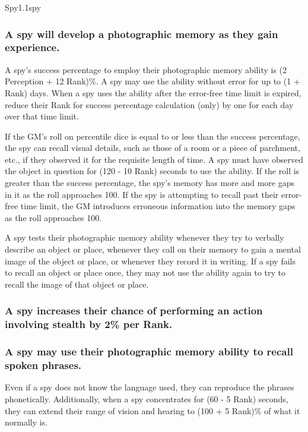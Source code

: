 \begin{skill}{Spy}{1.1}{spy}
\subsubsection{A spy will develop a photographic memory as they gain
experience.}

A spy's success percentage to employ their photographic memory ability
is (2 \x Perception + 12 \x Rank)\%.  A spy may use the ability
without error for up to (1 + Rank) days.  When a spy uses the ability
after the error-free time limit is expired, reduce their Rank for
success percentage calculation (only) by one for each day over that
time limit.

If the GM's roll on percentile dice is equal to or less than the
success percentage, the spy can recall visual details, such as those
of a room or a piece of parchment, etc., if they observed it for the
requisite length of time.  A spy must have observed the object in
question for (120 - 10 \x Rank) seconds to use the ability.  If the
roll is greater than the success percentage, the spy's memory has more
and more gaps in it as the roll approaches 100.  If the spy is
attempting to recall past their error-free time limit, the GM
introduces erroneous information into the memory gaps as the roll
approaches 100.

A spy tests their photographic memory ability whenever they try to
verbally describe an object or place, whenever they call on their
memory to gain a mental image of the object or place, or whenever they
record it in writing. If a spy fails to recall an object or place
once, they may not use the ability again to try to recall the image of
that object or place.

\subsubsection{A spy increases their chance of performing an action
involving stealth by 2\% per Rank.}


\subsubsection{A spy may use their photographic memory ability to recall
spoken phrases.}

Even if a spy does not know the language used, they can reproduce the
phrases phonetically.  Additionally, when a spy concentrates for (60 -
5 \x Rank) seconds, they can extend their range of vision and hearing
to (100 + 5 \x Rank)\% of what it normally is.

\end{skill}
